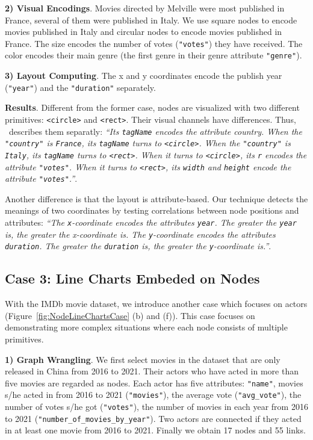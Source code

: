 \textbf{2) Visual Encodings}.
Movies directed by Melville were most published in France, several of them were published in Italy.
We use square nodes to encode movies published in Italy and circular nodes to encode movies published in France.
The size encodes the number of votes (\texttt{"votes"}) they have received.
The color encodes their main genre (the first genre in their genre attribute \texttt{"genre"}).

\textbf{3) Layout Computing}.
The x and y coordinates encode the publish year (\texttt{"year"}) and the \texttt{"duration"} separately.

\textbf{Results}.
Different from the former case, nodes are visualized with two different primitives: \texttt{<circle>} and \texttt{<rect>}.
Their visual channels have differences.
Thus, \ApproachName~describes them separatly:
\textit{``Its \texttt{tagName} encodes the attribute country.
When the \texttt{"country"} is \texttt{France}, its \texttt{tagName} turns to \texttt{<circle>}.
When the \texttt{"country"} is \texttt{Italy}, its \texttt{tagName} turns to \texttt{<rect>}.
When it turns to \texttt{<circle>}, 
its \texttt{r} encodes the attribute \texttt{"votes"}.
When it turns to \texttt{<rect>}, its \texttt{width} and \texttt{height} encode the attribute \texttt{"votes"}.''}.

Another difference is that the layout is attribute-based.
Our technique detects the meanings of two coordinates by testing correlations between node positions and attributes: 
\textit{``The \texttt{x}-coordinate encodes the attributes \texttt{year}. 
The greater the \texttt{year} is, the greater the x-coordinate is.
The \texttt{y}-coordinate encodes the attributes \texttt{duration}.
The greater the \texttt{duration} is, the greater the \texttt{y}-coordinate is.''}.

\subsection{Case 3: Line Charts Embeded on Nodes}
With the IMDb movie dataset, we introduce another case which focuses on actors (Figure~\ref{fig:NodeLineChartsCase} (b) and (f)).
This case focuses on demonstrating more complex situations where each node consists of multiple primitives.

\textbf{1) Graph Wrangling}. We first select movies in the dataset that are only released in China from 2016 to 2021.
Their actors who have acted in more than five movies are regarded as nodes.
Each actor has five attributes: \texttt{"name"}, movies s/he acted in from 2016 to 2021 (\texttt{"movies"}), the average vote (\texttt{"avg\_vote"}), the number of votes s/he got (\texttt{"votes"}), the number of movies in each year from 2016 to 2021 (\texttt{"number\_of\_movies\_by\_year"}).
Two actors are connected if they acted in at least one movie from 2016 to 2021.
Finally we obtain 17 nodes and 55 links.

